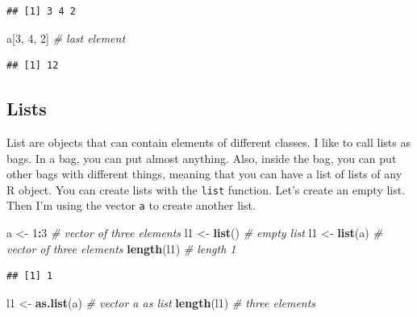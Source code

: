 \documentclass[12pt,graybox,envcountchap,sectrefs]{krantz}
\makeatletter
\newenvironment{Shaded}{\begin{snugshade}}{\end{snugshade}}
\newcommand{\KeywordTok}[1]{\textcolor[rgb]{0.13,0.29,0.53}{\textbf{#1}}}
\newcommand{\DecValTok}[1]{\textcolor[rgb]{0.00,0.00,0.81}{#1}}
\newcommand{\StringTok}[1]{\textcolor[rgb]{0.31,0.60,0.02}{#1}}
\newcommand{\CommentTok}[1]{\textcolor[rgb]{0.56,0.35,0.01}{\textit{#1}}}
\newcommand{\OperatorTok}[1]{\textcolor[rgb]{0.81,0.36,0.00}{\textbf{#1}}}
\newcommand{\NormalTok}[1]{#1}
\newenvironment{kframe}{%
\medskip{}
\setlength{\fboxsep}{.8em}
 \def\at@end@of@kframe{}%
 \ifinner\ifhmode%
  \def\at@end@of@kframe{\end{minipage}}%
  \begin{minipage}{\columnwidth}%
 \fi\fi%
 \def\FrameCommand##1{\hskip\@totalleftmargin \hskip-\fboxsep
 \colorbox{shadecolor}{##1}\hskip-\fboxsep
     \hskip-\linewidth \hskip-\@totalleftmargin \hskip\columnwidth}%
 \MakeFramed {\advance\hsize-\width
   \@totalleftmargin\z@ \linewidth\hsize
   \@setminipage}}%
 {\par\unskip\endMakeFramed%
 \at@end@of@kframe}
\renewenvironment{Shaded}{\begin{kframe}}{\end{kframe}}
\theoremstyle{definition}
\theoremstyle{definition}
\theoremstyle{definition}
\theoremstyle{remark}
\makeatother
\begin{document}
\begin{verbatim}
## [1] 3 4 2
\end{verbatim}

\begin{Shaded}
\begin{Highlighting}[]
\NormalTok{a[}\DecValTok{3}\NormalTok{, }\DecValTok{4}\NormalTok{, }\DecValTok{2}\NormalTok{] }\CommentTok{# last element}
\end{Highlighting}
\end{Shaded}

\begin{verbatim}
## [1] 12
\end{verbatim}

\subsection{Lists}\label{lists}

List are objects that can contain elements of different classes. I like
to call lists as bags. In a bag, you can put almost anything. Also,
inside the bag, you can put other bags with different things, meaning
that you can have a list of lists of any R object. You can create lists
with the \texttt{list} function. Let's create an empty list. Then I'm
using the vector \texttt{a} to create another list.

\begin{Shaded}
\begin{Highlighting}[]
\NormalTok{a <-}\StringTok{ }\DecValTok{1}\OperatorTok{:}\DecValTok{3}          \CommentTok{# vector of three elements}
\NormalTok{l1 <-}\StringTok{ }\KeywordTok{list}\NormalTok{()      }\CommentTok{# empty list}
\NormalTok{l1 <-}\StringTok{ }\KeywordTok{list}\NormalTok{(a)     }\CommentTok{# vector of three elements}
\KeywordTok{length}\NormalTok{(l1)        }\CommentTok{# length 1}
\end{Highlighting}
\end{Shaded}

\begin{verbatim}
## [1] 1
\end{verbatim}

\begin{Shaded}
\begin{Highlighting}[]
\NormalTok{l1 <-}\StringTok{ }\KeywordTok{as.list}\NormalTok{(a)  }\CommentTok{# vector a as list}
\KeywordTok{length}\NormalTok{(l1)        }\CommentTok{# three elements }
\end{Highlighting}
\end{Shaded}
\end{document}
